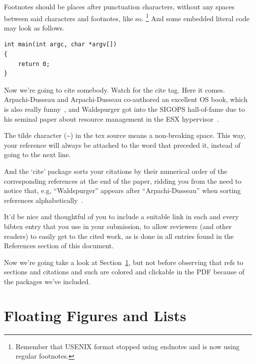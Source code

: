 \documentclass[a4paper,10pt,titlepage]{ctexart}
\begin{document}
Footnotes should be places after punctuation characters, without any
spaces between said characters and footnotes, like so.%
\footnote{Remember that USENIX format stopped using endnotes and is
  now using regular footnotes.} And some embedded literal code may
look as follows.

\begin{verbatim}
int main(int argc, char *argv[]) 
{
    return 0;
}
\end{verbatim}

Now we're going to cite somebody. Watch for the cite tag. Here it
comes. Arpachi-Dusseau and Arpachi-Dusseau co-authored an excellent OS
book, which is also really funny~\cite{arpachiDusseau18:osbook}, and
Waldspurger got into the SIGOPS hall-of-fame due to his seminal paper
about resource management in the ESX hypervisor~\cite{waldspurger02}.

The tilde character (\~{}) in the tex source means a non-breaking
space. This way, your reference will always be attached to the word
that preceded it, instead of going to the next line.

And the `cite' package sorts your citations by their numerical order
of the corresponding references at the end of the paper, ridding you
from the need to notice that, e.g, ``Waldspurger'' appears after
``Arpachi-Dusseau'' when sorting references
alphabetically~\cite{waldspurger02,arpachiDusseau18:osbook}. 

It'd be nice and thoughtful of you to include a suitable link in each
and every bibtex entry that you use in your submission, to allow
reviewers (and other readers) to easily get to the cited work, as is
done in all entries found in the References section of this document.

Now we're going take a look at Section~\ref{sec:figs}, but not before
observing that refs to sections and citations and such are colored and
clickable in the PDF because of the packages we've included.

\section{Floating Figures and Lists}
\label{sec:figs}
\end{document}

